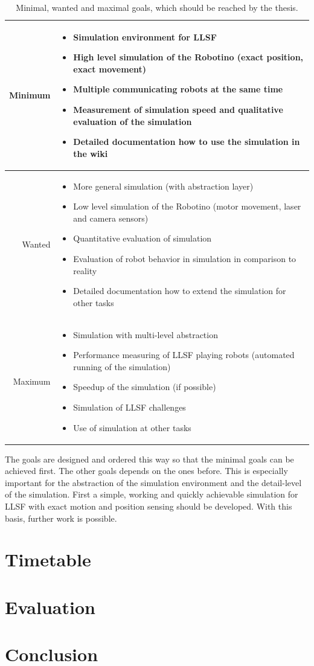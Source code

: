 \documentclass[11pt,a4paper,titlepage]{article}
\begin{document}
\begin{table}
\begin{tabular}{|r||p{10cm}|}
\hline
Minimum & \begin{itemize}
\item Simulation environment for LLSF
\item High level simulation of the Robotino (exact position, exact movement)
\item Multiple communicating robots at the same time
\item Measurement of simulation speed and qualitative evaluation of the simulation
\item Detailed documentation how to use the simulation in the wiki
\end{itemize}\\ \hline
Wanted & \begin{itemize}
\item More general simulation (with abstraction layer)
\item Low level simulation of the Robotino (motor movement, laser and camera sensors)
\item Quantitative evaluation of simulation
\item Evaluation of robot behavior in simulation in comparison to reality
\item Detailed documentation how to extend the simulation for other tasks
\end{itemize}\\ \hline
Maximum & \begin{itemize}
\item Simulation with multi-level abstraction
\item Performance measuring of LLSF playing robots (automated running of the simulation)
\item Speedup of the simulation (if possible)
\item Simulation of LLSF challenges
\item Use of simulation at other tasks
\end{itemize}\\
\hline
\end{tabular}
\label{Table 1}
\caption{Minimal, wanted and maximal goals, which should be reached by the thesis.}
\end{table}
The goals are designed and ordered this way so that the minimal goals can be achieved first. The other goals depends on the ones before. This is especially important for the abstraction of the simulation environment and the detail-level of the simulation. First a simple, working and quickly achievable simulation for LLSF with exact motion and position sensing should be developed. With this basis, further work is possible.\\


\section{Timetable}
\section{Evaluation}
\section{Conclusion}



\end{document}
